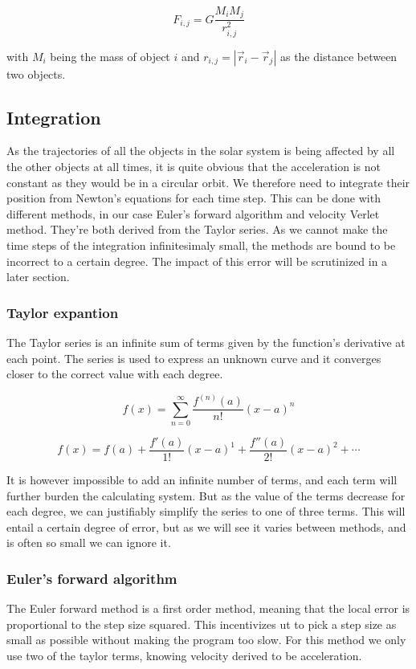 \documentclass[10pt]{article}
\begin{document}
\begin{multicols}{2}
\begin{equation}
    F_{i,j} =  G\frac{M_iM_j}{r_{i,j}^2}
\end{equation}

with $M_i$ being the mass of object $i$ and $r_{i,j} = |\vec r_i - \vec
r_j|$ as the distance between two objects.


\subsection{Integration}
As the trajectories of all the objects in the solar system is being
affected by all the other objects at all times, it is quite obvious that
the acceleration is not constant as they would be in a circular orbit. We
therefore need to integrate their position from Newton's equations for each
time step. This can be done with different methods, in our case Euler's
forward algorithm and velocity Verlet method. They're both derived from the
Taylor series. As we cannot make the time steps of the integration
infinitesimaly small, the methods are bound to be incorrect to a certain
degree. The impact of this error will be scrutinized in a later section.

\subsubsection{Taylor expantion}
The Taylor series is an infinite sum of terms given by the function's
derivative at each point. The series is used to express an unknown
curve and it converges closer to the correct value with each degree. 

\begin{equation}
   f(x) =  \sum_{n=0}^\infty\frac{f^{(n)}(a)}{n!}(x-a)^n
\end{equation}

\begin{equation}
    f(x) = f(a)+ \frac{f'(a)}{1!}(x-a)^1+\frac{f''(a)}{2!}(x-a)^2+\cdots
\end{equation}

It is however impossible to add an infinite number of terms, and each term
will further burden the calculating system. But as the value of the terms
decrease for each degree, we can justifiably simplify the series to one of
three terms. This will entail a certain degree of error, but as we will see
it varies between methods, and is often so small we can ignore it.

\subsubsection{Euler's forward algorithm}
The Euler forward method is a first order method, meaning that the local
error is proportional to the step size squared. This incentivizes ut to
pick a step size as small as possible without making the program too slow.
For this method we only use two of the taylor terms, knowing velocity
derived to be acceleration.  


\end{multicols}
\end{document}
